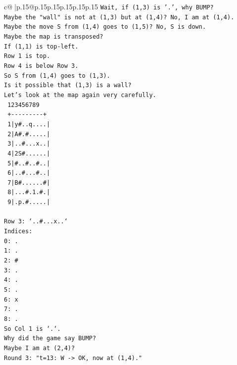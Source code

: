\documentclass{article}
\begin{document}
{\begin{supertabular}{c@{$\;$}|p{.15\linewidth}@{}p{.15\linewidth}p{.15\linewidth}p{.15\linewidth}p{.15\linewidth}p{.15\linewidth}}
{{{\texttt{Wait, if (1,3) is '.', why BUMP?} \\
\texttt{Maybe the "wall" is not at (1,3) but at (1,4)? No, I am at (1,4).} \\
\texttt{Maybe the move S from (1,4) goes to (1,5)? No, S is down.} \\
\texttt{Maybe the map is transposed?} \\
\texttt{If (1,1) is top{-}left.} \\
\texttt{Row 1 is top.} \\
\texttt{Row 4 is below Row 3.} \\
\texttt{So S from (1,4) goes to (1,3).} \\
\texttt{Is it possible that (1,3) is a wall?} \\
\texttt{Let's look at the map again very carefully.} \\
\texttt{   123456789} \\
\texttt{  +{-}{-}{-}{-}{-}{-}{-}{-}{-}+} \\
\texttt{ 1|y\#..q....|} \\
\texttt{ 2|A\#.\#.....|} \\
\texttt{ 3|..\#...x..|} \\
\texttt{ 4|2S\#......|} \\
\texttt{ 5|\#..\#..\#..|} \\
\texttt{ 6|..\#...\#..|} \\
\texttt{ 7|B\#......\#|} \\
\texttt{ 8|...\#.1.\#.|} \\
\texttt{ 9|.p.\#.....|} \\
\\ 
\texttt{Row 3: `..\#...x..`} \\
\texttt{Indices:} \\
\texttt{0: .} \\
\texttt{1: .} \\
\texttt{2: \#} \\
\texttt{3: .} \\
\texttt{4: .} \\
\texttt{5: .} \\
\texttt{6: x} \\
\texttt{7: .} \\
\texttt{8: .} \\
\texttt{So Col 1 is `.`.} \\
\texttt{Why did the game say BUMP?} \\
\texttt{Maybe I am at (2,4)?} \\
\texttt{Round 3: "t=13: W {-}> OK, now at (1,4)."} \\
}}}
\end{supertabular}}
\end{document}
